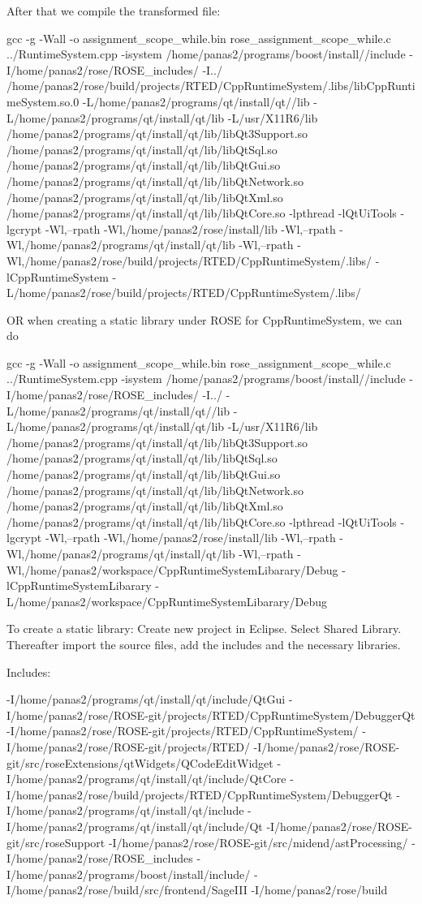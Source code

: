 After that we compile the transformed file:

  gcc -g -Wall -o assignment_scope_while.bin rose_assignment_scope_while.c ../RuntimeSystem.cpp -isystem /home/panas2/programs/boost/install//include -I/home/panas2/rose/ROSE_includes/ -I../ /home/panas2/rose/build/projects/RTED/CppRuntimeSystem/.libs/libCppRuntimeSystem.so.0 -L/home/panas2/programs/qt/install/qt//lib -L/home/panas2/programs/qt/install/qt/lib -L/usr/X11R6/lib /home/panas2/programs/qt/install/qt/lib/libQt3Support.so /home/panas2/programs/qt/install/qt/lib/libQtSql.so /home/panas2/programs/qt/install/qt/lib/libQtGui.so /home/panas2/programs/qt/install/qt/lib/libQtNetwork.so /home/panas2/programs/qt/install/qt/lib/libQtXml.so /home/panas2/programs/qt/install/qt/lib/libQtCore.so -lpthread -lQtUiTools -lgcrypt  -Wl,--rpath -Wl,/home/panas2/rose/install/lib -Wl,--rpath -Wl,/home/panas2/programs/qt/install/qt/lib -Wl,--rpath -Wl,/home/panas2/rose/build/projects/RTED/CppRuntimeSystem/.libs/ -lCppRuntimeSystem -L/home/panas2/rose/build/projects/RTED/CppRuntimeSystem/.libs/

OR when creating a static library under ROSE for CppRuntimeSystem, we can do

  gcc -g -Wall -o assignment_scope_while.bin rose_assignment_scope_while.c ../RuntimeSystem.cpp -isystem /home/panas2/programs/boost/install//include -I/home/panas2/rose/ROSE_includes/ -I../ -L/home/panas2/programs/qt/install/qt//lib -L/home/panas2/programs/qt/install/qt/lib -L/usr/X11R6/lib /home/panas2/programs/qt/install/qt/lib/libQt3Support.so /home/panas2/programs/qt/install/qt/lib/libQtSql.so /home/panas2/programs/qt/install/qt/lib/libQtGui.so /home/panas2/programs/qt/install/qt/lib/libQtNetwork.so /home/panas2/programs/qt/install/qt/lib/libQtXml.so /home/panas2/programs/qt/install/qt/lib/libQtCore.so -lpthread -lQtUiTools -lgcrypt  -Wl,--rpath -Wl,/home/panas2/rose/install/lib -Wl,--rpath -Wl,/home/panas2/programs/qt/install/qt/lib -Wl,--rpath -Wl,/home/panas2/workspace/CppRuntimeSystemLibarary/Debug -lCppRuntimeSystemLibarary -L/home/panas2/workspace/CppRuntimeSystemLibarary/Debug

To create a static library: Create new project in Eclipse. Select Shared Library. Thereafter import the source files, add the includes and the necessary libraries.

Includes:

  -I/home/panas2/programs/qt/install/qt/include/QtGui -I/home/panas2/rose/ROSE-git/projects/RTED/CppRuntimeSystem/DebuggerQt -I/home/panas2/rose/ROSE-git/projects/RTED/CppRuntimeSystem/ -I/home/panas2/rose/ROSE-git/projects/RTED/ -I/home/panas2/rose/ROSE-git/src/roseExtensions/qtWidgets/QCodeEditWidget -I/home/panas2/programs/qt/install/qt/include/QtCore -I/home/panas2/rose/build/projects/RTED/CppRuntimeSystem/DebuggerQt -I/home/panas2/programs/qt/install/qt/include -I/home/panas2/programs/qt/install/qt/include/Qt -I/home/panas2/rose/ROSE-git/src/roseSupport -I/home/panas2/rose/ROSE-git/src/midend/astProcessing/ -I/home/panas2/rose/ROSE_includes -I/home/panas2/programs/boost/install/include/ -I/home/panas2/rose/build/src/frontend/SageIII -I/home/panas2/rose/build

